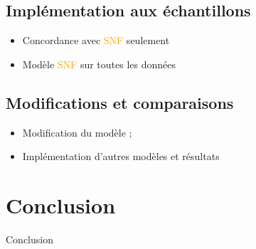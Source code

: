 \documentclass[a4paper, 12pt, svgnames]{article}
\begin{document}
\subsection{Implémentation aux échantillons}
\begin{itemize}
    \item Concordance avec \textcolor{orange}{SNF} seulement
    \item Modèle \textcolor{orange}{SNF} sur toutes les données
\end{itemize}

\subsection{Modifications et comparaisons}
\begin{itemize}
    \item Modification du modèle ;
    \item Implémentation d'autres modèles et résultats
\end{itemize}

\section{Conclusion}
Conclusion

%


\end{document}
